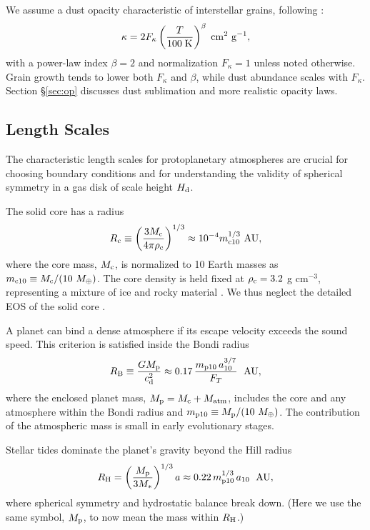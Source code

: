 \documentclass[apj, numberedappendix]{emulateapj}
\newcommand{\AU}{\; {\rm AU}}
\newcommand{\RB}{R_{\rm B}}
\newcommand{\RH}{R_{\rm H}}
\newcommand{\co}{_{\rm c}}
\newcommand{\pla}{_{\rm p}}
\newcommand{\di}{_{\rm d}}
\newcommand{\mcn}[1] { m_{ \rm c #1} }
\newcommand{\mpn}[1] { m_{ \rm p #1} }
\newcommand{\aun}[1]{ a_{#1} }
\begin{document}
We assume a dust opacity characteristic of interstellar grains, following \citet{bell94}:
\begin{equation}
\label{eq:opacitylaw}
\kappa= 2 F_\kappa  \left(\frac{T}{100\; \rm{K}}\right)^{\beta} \; \mathrm{cm^2 ~ g^{-1}},
\end{equation}
with a power-law index $\beta = 2$ and normalization $F_\kappa = 1$ unless noted otherwise. Grain growth tends to lower both $F_\kappa$ and $\beta$, while dust abundance scales with $F_\kappa$.   Section \S\ref{sec:op} discusses dust sublimation and more realistic opacity laws.


\subsection{Length Scales}
\label{sec:scales}

The characteristic length scales for protoplanetary atmospheres are crucial for choosing boundary conditions and for understanding the validity of  spherical symmetry in a gas disk of scale height $H\di$.

The solid core has a radius
\begin{equation}
\label{eq:rc}
R\co \equiv \left(\frac{3 M\co}{4 \pi \rho\co}\right)^{1/3} \approx 10^{-4} \mcn{10}^{1/3} ~\text{AU},
\end{equation}
where the core mass, $M\co$, is normalized to 10 Earth masses as $\mcn{10} \equiv M\co/(10~M_\oplus)$. The core density is held fixed at $\rho\co=3.2$ g cm$^{-3}$, representing a mixture of ice and rocky material \citep{pap99}.  We thus neglect  the detailed EOS of the solid core \citep{fortney07}.

A planet can bind a dense atmosphere if its escape velocity exceeds the sound speed.  This criterion is satisfied inside the Bondi radius
\begin{equation}
\label{eq:RB}
\RB \equiv \frac{G M\pla}{c\di^2} \approx 0.17 \, {\mpn{10}  \, \aun{10}^{3/7} \over F_T} ~\AU,
\end{equation}
where the enclosed planet mass, $M\pla = M\co + M_\mathrm{atm}$, includes the core and any atmosphere within the Bondi radius and $\mpn{10} \equiv M\pla /(10~M_\oplus)$.   The contribution of the atmospheric mass is small in early evolutionary stages.

Stellar tides dominate the planet's gravity beyond the Hill radius
\begin{equation}
\label{eq:RHill}
R_{\rm H} = \left(M\pla \over 3 M_\ast \right)^{1/3}a \approx 0.22 \, {\mpn{10}^{1/3} \, \aun{10} }~\AU ,
\end{equation}
where spherical symmetry and hydrostatic balance break down.  (Here we use the same symbol, $M\pla$, to now mean the mass within $\RH$.) 
\end{document}
